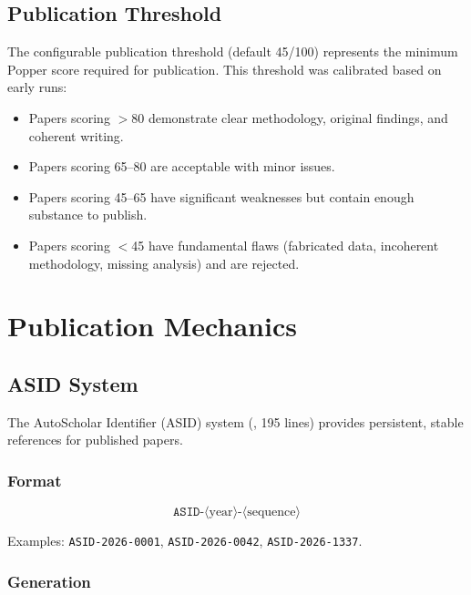 \subsection{Publication Threshold}

The configurable publication threshold (default 45/100) represents the minimum Popper score required for publication.
This threshold was calibrated based on early runs:

\begin{itemize}
  \item Papers scoring $>$80 demonstrate clear methodology, original findings, and coherent writing.
  \item Papers scoring 65--80 are acceptable with minor issues.
  \item Papers scoring 45--65 have significant weaknesses but contain enough substance to publish.
  \item Papers scoring $<$45 have fundamental flaws (fabricated data, incoherent methodology, missing analysis) and are rejected.
\end{itemize}

\section{Publication Mechanics}
\label{sec:journal:publication}

\subsection{ASID System}

The AutoScholar Identifier (ASID) system (, 195 lines) provides persistent, stable references for published papers.

\subsubsection{Format}

\begin{equation}
\texttt{ASID-}\langle\text{year}\rangle\texttt{-}\langle\text{sequence}\rangle
\end{equation}

Examples: \texttt{ASID-2026-0001}, \texttt{ASID-2026-0042}, \texttt{ASID-2026-1337}.

\subsubsection{Generation}

